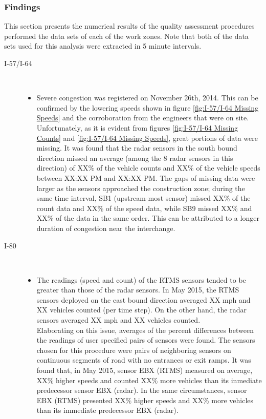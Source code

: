 \documentclass[11pt]{article}
\begin{document}
\subsubsection{Findings}
This section presents the numerical results of the quality assessment procedures performed the data sets of each of the work zones. Note that both of the data sets used for this analysis were extracted in 5 minute intervals.
\begin{description}
	\item[I-57/I-64] \hfill \\
		\begin{itemize}
			\item Severe congestion was registered on November 26th, 2014. This can be confirmed by the lowering speeds shown in figure \ref{fig:I-57/I-64 Missing Speeds} and the corroboration from the engineers that were on site. Unfortunately, as it is evident from figures \ref{fig:I-57/I-64 Missing Counts} and \ref{fig:I-57/I-64 Missing Speeds}, great portions of data were missing. It was found that the radar sensors in the south bound direction missed an average (among the 8 radar sensors in this direction) of XX\% of the vehicle counts and XX\% of the vehicle speeds between XX:XX PM and XX:XX PM. The gaps of missing data were larger as the sensors approached the construction zone; during the same time interval, SB1 (upstream-most sensor) missed XX\% of the count data and XX\% of the speed data, while SB9 missed XX\% and XX\% of the data in the same order. This can be attributed to a longer duration of congestion near the interchange.
			
		\end{itemize}
	
	\item[I-80] \hfill \\
		\begin{itemize}
			\item  The readings (speed and count) of the RTMS sensors tended to be greater than those of the radar sensors. In May 2015, the RTMS sensors deployed on the east bound direction averaged XX mph and XX vehicles counted (per time step). On the other hand, the radar sensors averaged XX mph and XX vehicles counted.
		\\
		
Elaborating on this issue, averages of the percent differences between the readings of user specified pairs of sensors were found. The sensors chosen for this procedure were pairs of neighboring sensors on continuous segments of road with no entrances or exit ramps. It was found that, in May 2015, sensor EBX (RTMS) measured on average, XX\% higher speeds and counted XX\% more vehicles than its inmediate predecessor sensor EBX (radar). In the same circumstances, sensor EBX (RTMS) presented XX\% higher speeds and XX\% more vehicles than its immediate predecessor EBX (radar).


\end{itemize}
\end{description}
\end{document}
